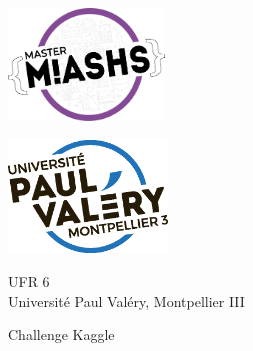\begin{minipage}{.4\textwidth}
\begin{center}
\includegraphics[height=3cm]{logos/master.pdf}
\end{center}
\end{minipage}%
\hspace{2cm}
\begin{minipage}{.4\textwidth}
\begin{center}
\includegraphics[height=3cm]{logos/upv.eps}
\end{center}
\end{minipage}%


\begin{center}
\vspace{1cm}
{\huge UFR 6}\\
Université Paul Valéry, Montpellier III\\
\vspace{1cm}

{\Large Challenge Kaggle}
\end{center}
\noindent\makebox[\linewidth]{\rule{\paperwidth}{0.4pt}}
\vspace{-20em}
{\let\newpage\relax\maketitle}
\vspace{-15em}
\noindent\makebox[\linewidth]{\rule{\paperwidth}{0.4pt}}

\begin{minipage}{.45\textwidth}

\end{minipage}%
\hspace{0.5cm}
\begin{minipage}{.45\textwidth}
\vspace{3em}
  
\end{minipage}
\newpage